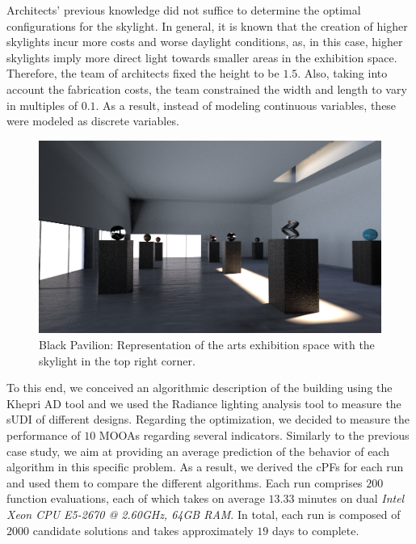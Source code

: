 Architects' previous knowledge did not suffice to determine the optimal configurations for the skylight. In general, it is known that the creation of higher skylights incur more costs and worse daylight conditions, as, in this case, higher skylights imply more direct light towards smaller areas in the exhibition space. Therefore, the team of architects fixed the height to be $1.5$\metre. Also, taking into account the fabrication costs, the team constrained the width and length to vary in multiples of $0.1$\metre. As a result, instead of modeling continuous variables, these were modeled as discrete variables.
\begin{figure}[h!]
	\centering
	\includegraphics[width=\textwidth]{Images/Evaluation/BlackPavilion/PavPretoExample116x7204.png}
	\caption[Black Pavilion: Representation of the arts exhibition space with a skylight]{Black Pavilion: Representation of the arts exhibition space with the skylight in the top right corner.}
	\label{fig:blackpavilion}
\end{figure}

To this end, we conceived an algorithmic description of the building using the Khepri \ac{AD} tool and we used the Radiance lighting analysis tool to measure the \ac{sUDI} of different designs. Regarding the optimization, we decided to measure the performance of $10$ \acp{MOOA} regarding several indicators. Similarly to the previous case study, we aim at providing an average prediction of the behavior of each algorithm in this specific problem. As a result, we derived the \acp{cPF} for each run and used them to compare the different algorithms. Each run comprises $200$ function evaluations, each of which takes on average $13.33$ minutes on dual \textit{Intel Xeon CPU E5-2670 @ 2.60GHz, 64GB RAM}. In total, each run is composed of $2000$ candidate solutions and takes approximately $19$ days to complete.

